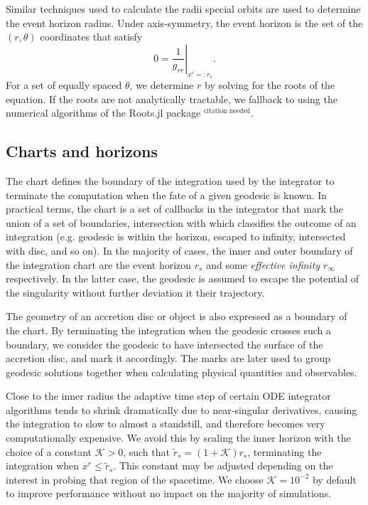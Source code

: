 \documentclass[fleqn,usenatbib]{mnras}
\newcommand{\citneeded}{{\bf \color{red} $^{\text{citation needed}}$}}
\begin{document}
Similar techniques used to calculate the radii special orbits are used to
determine the event horizon radius. Under axis-symmetry, the event horizon is
the set of the $(r, \theta)$ coordinates that satisfy
\begin{equation}
    \label{eq:event_horizon}
    0 = \left. \frac{1}{g_{rr}} \right\rvert_{x^r =: r_s}.
\end{equation}
For a set of equally spaced $\theta$, we determine $r$ by solving for the roots
of the equation. If the roots are not analytically tractable, we fallback to
using the numerical algorithms of the Roots.jl package\citneeded.

\subsection{Charts and horizons}

The chart defines the boundary of the integration used by the integrator to
terminate the computation when the fate of a given geodesic is known. In
practical terms, the chart is a set of callbacks in the integrator that mark the
union of a set of boundaries, intersection with which classifies the outcome of
an integration (e.g. geodesic is within the horizon, escaped to infinity, intersected with
disc, and so on). In the majority of cases, the inner and outer boundary of the integration
chart are the event horizon $r_s$ and some \emph{effective infinity} $r_\infty$
respectively. In the latter case, the geodesic is assumed to escape the
potential of the singularity without further deviation it their trajectory.

The geometry of an accretion disc or object is also expressed as a boundary of
the chart. By terminating the integration when the geodesic crosses such a
boundary, we consider the geodesic to have intersected the surface of the
accretion disc, and mark it accordingly. The marks are later used to group
geodesic solutions together when calculating physical quantities and
observables.

Close to the inner radius the adaptive time step of certain ODE integrator
algorithms tends to shrink dramatically due to near-singular derivatives,
causing the integration to slow to almost a standstill, and therefore becomes
very computationally expensive. We avoid this by scaling the inner horizon
with the choice of a constant $\mathcal{K} > 0$, such that $\tilde{r}_s = (1 +
\mathcal{K}) r_s$, terminating the integration when $x^r \leq
\tilde{r}_s$. This constant may be adjusted depending on the interest
in probing that region of the spacetime. We choose $\mathcal{K} =
10^{-2}$ by default to improve performance without no impact on the majority of
simulations.
\end{document}
